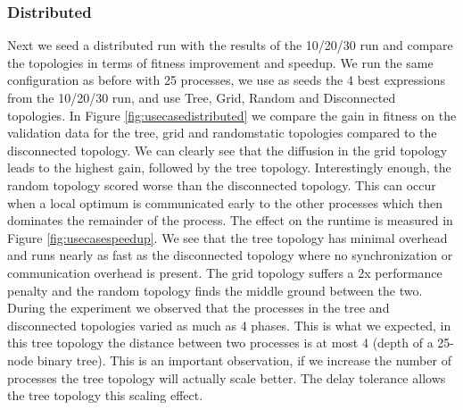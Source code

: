 \subsubsection{Distributed}
Next we seed a distributed run with the results of the 10/20/30 run and compare the topologies in terms of fitness improvement and speedup. We run the same configuration as before with 25 processes, we use as seeds the 4 best expressions from the 10/20/30 run, and use Tree, Grid, Random and Disconnected topologies. In Figure \ref{fig:usecasedistributed} we compare the gain in fitness on the validation data for the tree, grid and randomstatic topologies compared to the disconnected topology. We can clearly see that the diffusion in the grid topology leads to the highest gain, followed by the tree topology. Interestingly enough, the random topology scored worse than the disconnected topology. This can occur when a local optimum is communicated early to the other processes which then dominates the remainder of the process. The effect on the runtime is measured in Figure \ref{fig:usecasespeedup}. We see that the tree topology has minimal overhead and runs nearly as fast as the disconnected topology where no synchronization or communication overhead is present. The grid topology suffers a 2x performance penalty and the random topology finds the middle ground between the two. During the experiment we observed that the processes in the tree and disconnected topologies varied as much as 4 phases. This is what we expected, in this tree topology the distance between two processes is at most 4 (depth of a 25-node binary tree). This is an important observation, if we increase the number of processes the tree topology will actually scale better. The delay tolerance allows the tree topology this scaling effect.
